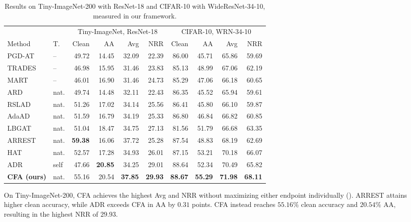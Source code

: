 \begin{table}[!htbp]
  \centering
  \footnotesize
  \setlength{\tabcolsep}{3.2pt}
  \caption{
  Results on Tiny-ImageNet-200 with ResNet-18 and CIFAR-10 with
  WideResNet-34-10, measured in our framework.
  }
  \label{tab:scale}
  \begin{tabular}{llrrrrrrrr}
    \toprule
    & & \multicolumn{4}{c}{Tiny-ImageNet, ResNet-18}
      & \multicolumn{4}{c}{CIFAR-10, WRN-34-10} \\
    \cmidrule(lr){3-6}\cmidrule(lr){7-10}
    Method & T. & Clean & AA & Avg & NRR
           & Clean & AA & Avg & NRR \\
    \midrule
    PGD-AT & -- & 49.72 & 14.45 & 32.09 & 22.39
                 & 86.00 & 45.71 & 65.86 & 59.69 \\
    TRADES & -- & 46.98 & 15.95 & 31.46 & 23.83
                 & 85.13 & 48.99 & 67.06 & 62.19 \\
    MART & -- & 46.01 & 16.90 & 31.46 & 24.73
               & 85.29 & 47.06 & 66.18 & 60.65 \\
    \midrule
    ARD & nat. & 49.74 & 14.48 & 32.11 & 22.43
               & 86.35 & 45.52 & 65.94 & 59.61 \\
    RSLAD & nat. & 51.26 & 17.02 & 34.14 & 25.56
                 & 86.41 & 45.80 & 66.10 & 59.87 \\
    AdaAD & nat. & 51.59 & 16.79 & 34.19 & 25.33
                 & 86.80 & 46.84 & 66.82 & 60.85 \\
    LBGAT & nat. & 51.04 & 18.47 & 34.75 & 27.13
                 & 81.56 & 51.79 & 66.68 & 63.35 \\
    ARREST & nat. & \textbf{59.38} & 16.06 & 37.72 & 25.28
                  & 87.54 & 48.83 & 68.19 & 62.69 \\
    HAT & nat. & 52.57 & 17.28 & 34.93 & 26.01
               & 87.15 & 53.21 & 70.18 & 66.07 \\
    ADR & self & 47.66 & \textbf{20.85} & 34.25 & 29.01
               & 88.64 & 52.34 & 70.49 & 65.82 \\
    \midrule
    \textbf{CFA (ours)}
      & nat.
      & 55.16 & 20.54 & \textbf{37.85} & \textbf{29.93}
      & \textbf{88.67} & \textbf{55.29}
      & \textbf{71.98} & \textbf{68.11} \\
    \bottomrule
  \end{tabular}
\end{table}

On Tiny-ImageNet-200, CFA achieves the highest Avg and NRR without maximizing
either endpoint individually ().
ARREST attains higher clean accuracy, while ADR exceeds CFA in AA by
\(0.31\) points.
CFA instead reaches \(55.16\%\) clean accuracy and \(20.54\%\) AA,
resulting in the highest NRR of \(29.93\).

